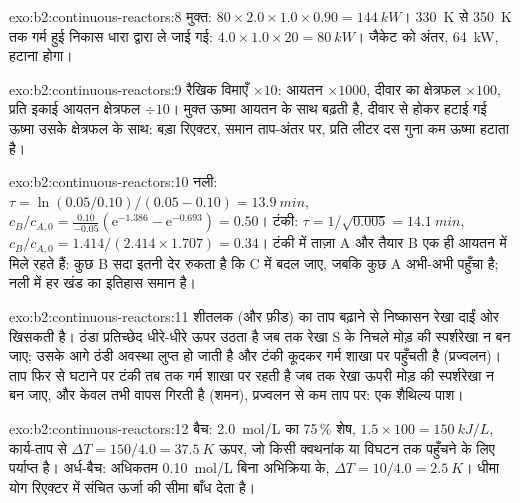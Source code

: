 \begin{solution}{exo:b2:continuous-reactors:8}
मुक्त: $80 \times 2.0 \times 1.0 \times 0.90 = \qty{144}{kW}$। \qty{330}{K} से \qty{350}{K} तक
गर्म हुई निकास धारा द्वारा ले जाई गई: $4.0 \times 1.0 \times 20 =
\qty{80}{kW}$। जैकेट को अंतर, \qty{64}{kW}, हटाना होगा।
\end{solution}

\begin{solution}{exo:b2:continuous-reactors:9}
रैखिक विमाएँ $\times 10$: आयतन $\times 1000$, दीवार का क्षेत्रफल $\times 100$, प्रति
इकाई आयतन क्षेत्रफल $\div 10$। मुक्त ऊष्मा आयतन के साथ बढ़ती है, दीवार से होकर
हटाई गई ऊष्मा उसके क्षेत्रफल के साथ: बड़ा रिएक्टर, समान ताप-अंतर पर, प्रति लीटर
दस गुना कम ऊष्मा हटाता है।
\end{solution}

\begin{solution}{exo:b2:continuous-reactors:10}
नली: $\tau = \ln(0.05/0.10)/(0.05 - 0.10) = \qty{13.9}{min}$, $c_B/c_{A,0} =
\frac{0.10}{-0.05}(\mathrm e^{-1.386} - \mathrm e^{-0.693}) = 0.50$। टंकी: $\tau =
1/\sqrt{0.005} = \qty{14.1}{min}$, $c_B/c_{A,0} = 1.414/(2.414 \times 1.707) =
0.34$। टंकी में ताज़ा A और तैयार B एक ही आयतन में मिले रहते हैं: कुछ
B सदा इतनी देर रुकता है कि C में बदल जाए, जबकि कुछ A अभी-अभी
पहुँचा है; नली में हर खंड का इतिहास समान है।
\end{solution}

\begin{solution}{exo:b2:continuous-reactors:11}
शीतलक (और फ़ीड) का ताप बढ़ाने से निष्कासन रेखा दाईं ओर
खिसकती है। ठंडा प्रतिच्छेद धीरे-धीरे ऊपर उठता है जब तक रेखा S के निचले मोड़ की
स्पर्शरेखा न बन जाए; उसके आगे ठंडी अवस्था लुप्त हो जाती है और टंकी कूदकर
गर्म शाखा पर पहुँचती है (प्रज्वलन)। ताप फिर से घटाने पर टंकी तब तक
गर्म शाखा पर रहती है जब तक रेखा ऊपरी मोड़ की स्पर्शरेखा न बन जाए, और केवल
तभी वापस गिरती है (शमन), प्रज्वलन से कम ताप पर: एक
शैथिल्य पाश।
\end{solution}

\begin{solution}{exo:b2:continuous-reactors:12}
बैच: \qty{2.0}{mol/L} का 75\,\% शेष, $1.5 \times 100 = \qty{150}{kJ/L}$,
कार्य-ताप से $\Delta T = 150/4.0 = \qty{37.5}{K}$ ऊपर, जो किसी क्वथनांक
या विघटन तक पहुँचने के लिए पर्याप्त है। अर्ध-बैच: अधिकतम
\qty{0.10}{mol/L} बिना अभिक्रिया के, $\Delta T = 10/4.0 = \qty{2.5}{K}$। धीमा योग
रिएक्टर में संचित ऊर्जा की सीमा बाँध देता है।
\end{solution}

